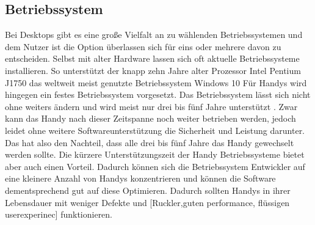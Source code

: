 \subsection{Betriebssystem}\myCheckmark
Bei Desktops gibt es eine große Vielfalt an zu wählenden Betriebssystemen und dem Nutzer ist die Option überlassen sich für eins oder mehrere davon zu entscheiden. %
	Selbst mit alter Hardware lassen sich oft aktuelle Betriebssysteme installieren. So unterstützt der knapp zehn Jahre alter Prozessor Intel Pentium J1750 das weltweit meist genutzte Betriebssystem Windows 10\cite{pcVsphone_intelWindowsSupport, pcVsphone_destkopOperatingSystem, pcVsphone_windowsVersions}\newline%
Für Handys wird hingegen ein festes Betriebssystem vorgesetzt. %
	Das Betriebssystem lässt sich nicht ohne weiters ändern und wird meist nur drei bis fünf Jahre unterstützt \cite{pcVsphone_deviceSupportGoogle}\cite{pcVsphone_deviceSupportApple}. %
		Zwar kann das Handy nach dieser Zeitspanne noch weiter betrieben werden, jedoch leidet ohne weitere Softwareunterstützung die Sicherheit und Leistung darunter. Das hat also den Nachteil, dass alle drei bis fünf Jahre das Handy gewechselt werden sollte.\newline%
		Die kürzere Unterstützungszeit der Handy Betriebssysteme bietet aber auch einen Vorteil. Dadurch können sich die Betriebssystem Entwickler auf eine kleinere Anzahl von Handys konzentrieren und können die Software dementsprechend gut auf diese Optimieren. Dadurch sollten Handys in ihrer Lebensdauer mit weniger Defekte und [Ruckler,guten performance, flüssigen userexperinec] funktionieren.\newline%








